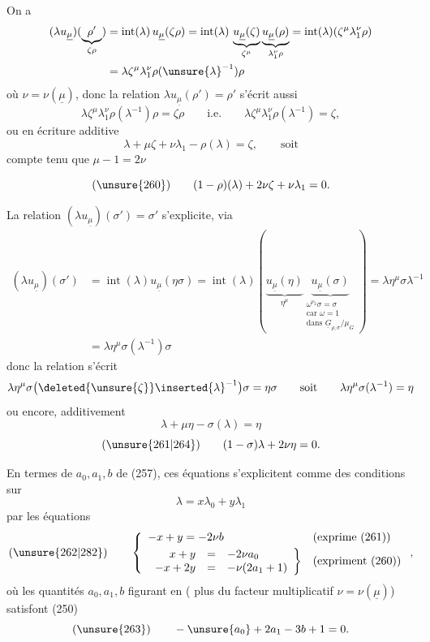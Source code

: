 On a\unsure{:}
\[
\begin{aligned}
(\lambda u_{\underline{\mu}})
(\underbrace{\rho'}_{\zeta\rho})
&=\operatorname{int}(\lambda)\,u_{\underline{\mu}}(\zeta\rho)
=\operatorname{int}(\lambda)\,
\underbrace{u_{\underline{\mu}}(\zeta)}_{\zeta^{\mu}}
\underbrace{u_{\underline{\mu}}(\rho)}_{\lambda_1^{\nu}\rho}
=\operatorname{int}(\lambda)(\zeta^{\mu}\lambda_1^{\nu}\rho)\\
&=\lambda\zeta^{\mu}\lambda_1^{\nu}\rho(\unsure{\lambda}^{-1})\rho
\end{aligned}
\]
où $\nu=\nu(\underline{\mu})$, donc la relation
$\lambda u_{\underline{\mu}}(\rho')=\rho'$ s'écrit aussi
\[
\lambda\zeta^{\mu}\lambda_1^{\nu}\rho(\lambda^{-1})\rho
=\zeta\rho\qquad\text{i.e.}\qquad
\lambda\zeta^{\mu}\lambda_1^{\nu}\rho(\lambda^{-1})=\zeta,
\]
ou en écriture additive
\[
\lambda+\mu\zeta+\nu\lambda_1-\rho(\lambda)=\zeta,
\qquad\text{soit}
\]
compte tenu que $\mu-1=2\nu$


\[
(\unsure{260})\qquad(1-\rho)(\lambda)+2\nu\zeta+\nu\lambda_1=0.
\]

La relation $(\lambda u_{\underline{\mu}})(\sigma')=\sigma'$ s'explicite, via
\[
\begin{aligned}
(\lambda u_{\underline{\mu}})(\sigma')
&=\operatorname{int}(\lambda)u_{\underline{\mu}}(\eta\sigma)
=\operatorname{int}(\lambda)\left(
\underbrace{u_{\underline{\mu}}(\eta)}_{\eta^{\mu}}
\underbrace{u_{\underline{\mu}}(\sigma)}_{
\substack{\omega^{\nu_2}\sigma=\sigma\\
\text{car }\omega=1\\
\text{dans }\underline{G}_{\rho,\sigma}/\mu_G}}
\right)=\lambda\eta^{\mu}\sigma\lambda^{-1}\\
&=\lambda\eta^{\mu}\sigma(\lambda^{-1})\sigma
\end{aligned}
\]
donc la relation  s'écrit
\[
\lambda\eta^{\mu}\sigma\bigl(\deleted{\unsure{\zeta}}\inserted{\lambda}^{-1}\bigr)\sigma
=\eta\sigma\qquad\text{soit}\qquad
\lambda\eta^{\mu}\sigma(\lambda^{-1})=\eta
\]
ou encore, additivement
\[
\lambda+\mu\eta-\sigma(\lambda)=\eta
\]
\[
(\unsure{261|264})\qquad(1-\sigma)\lambda+2\nu\eta=0.
\]

En termes de $a_0,a_1,b$ de (257), ces équations s'explicitent comme des
conditions sur
\[
\lambda=x\lambda_0+y\lambda_1
\]
par les équations
\[
(\unsure{262|282})\qquad
\left\{
\begin{array}{ll}
-x+y=-2\nu b&\text{(exprime (261))}\\[3pt]
\left.\begin{array}{rcl}
x+y&=&-2\nu a_0\\
-x+2y&=&-\nu(2a_1+1)
\end{array}\right\}&\text{(expriment (260))}
\end{array}\right.,
\]
où les quantités $a_0,a_1,b$ figurant en 
( plus du facteur multiplicatif
$\nu=\nu(\underline{\mu})$) satisfont (250)
\[
(\unsure{263})\qquad-\unsure{a_0}+2a_1-3b+1=0.
\]

